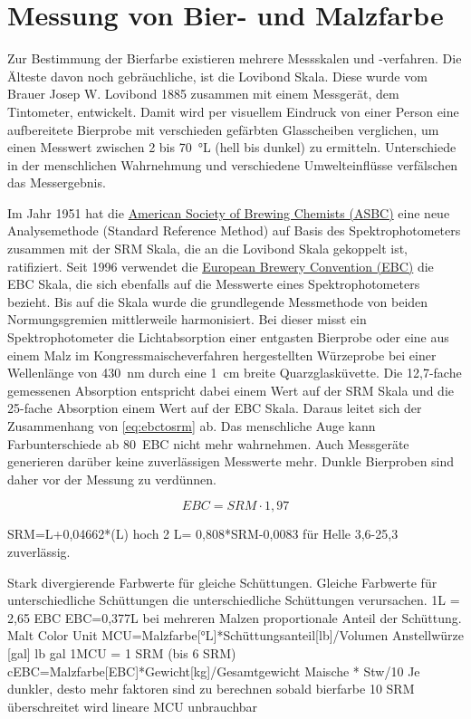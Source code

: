\documentclass[a4paper,parskip=half]{scrartcl}
\newcommand{\EBC}{\mathit{EBC}}
\newcommand{\SRM}{\mathit{SRM}}
\begin{document}
\section*{Messung von Bier- und Malzfarbe}

Zur Bestimmung der Bierfarbe existieren mehrere Messskalen und -verfahren. Die Älteste davon noch gebräuchliche, ist die Lovibond Skala. Diese wurde vom Brauer Josep W. Lovibond 1885 zusammen mit einem Messgerät, dem Tintometer, entwickelt. Damit wird per visuellem Eindruck von einer Person eine aufbereitete Bierprobe mit verschieden gefärbten Glasscheiben verglichen, um einen Messwert zwischen 2 bis 70~°L (hell bis dunkel) zu ermitteln. Unterschiede in der menschlichen Wahrnehmung und verschiedene Umwelteinflüsse verfälschen das Messergebnis. \parencite{KrausWeyermann2021a}

Im Jahr 1951 hat die \href{https://www.asbcnet.org}{American Society of Brewing Chemists (ASBC)} eine neue Analysemethode (Standard Reference Method) auf Basis des Spektrophotometers zusammen mit der SRM Skala, die an die Lovibond Skala gekoppelt ist, ratifiziert. Seit 1996 verwendet die \href{https://europeanbreweryconvention.eu}{European Brewery Convention (EBC)} die EBC Skala, die sich ebenfalls auf die Messwerte eines Spektrophotometers bezieht. Bis auf die Skala wurde die grundlegende Messmethode von beiden Normungsgremien mittlerweile harmonisiert. Bei dieser misst ein Spektrophotometer die Lichtabsorption einer entgasten Bierprobe oder eine aus einem Malz im Kongressmaischeverfahren hergestellten Würzeprobe bei einer Wellenlänge von 430~nm durch eine 1~cm breite Quarzglasküvette. Die 12,7-fache gemessenen Absorption entspricht dabei  einem Wert auf der SRM Skala und die 25-fache Absorption einem Wert auf der EBC Skala. Daraus leitet sich der Zusammenhang von \autoref{eq:ebctosrm} ab. Das menschliche Auge kann Farbunterschiede ab 80~EBC nicht mehr wahrnehmen. Auch Messgeräte generieren darüber keine zuverlässigen Messwerte mehr. Dunkle Bierproben sind daher vor der Messung zu verdünnen. \parencite{KrausWeyermann2021a}

\begin{equation}
\EBC = \SRM \cdot 1,97
\label{eq:ebctosrm}
\end{equation}



\parencite{KrausWeyermann2021a}
SRM=L+0,04662*(L) hoch 2
L= 0,808*SRM-0,0083 für Helle
3,6-25,3 zuverlässig. 


\parencite{KrausWeyermann2021b}
Stark divergierende Farbwerte für gleiche Schüttungen.
Gleiche Farbwerte für unterschiedliche Schüttungen die 
unterschiedliche Schüttungen verursachen.
1L = 2,65 EBC
EBC=0,377L
bei mehreren Malzen proportionale Anteil der Schüttung.
Malt Color Unit MCU=Malzfarbe[°L]*Schüttungsanteil[lb]/Volumen Anstellwürze [gal]
lb gal 
1MCU = 1 SRM (bis 6 SRM)
cEBC=Malzfarbe[EBC]*Gewicht[kg]/Gesamtgewicht Maische * Stw/10 
Je dunkler, desto mehr faktoren sind zu berechnen
sobald bierfarbe 10 SRM überschreitet wird lineare MCU unbrauchbar
\end{document}
